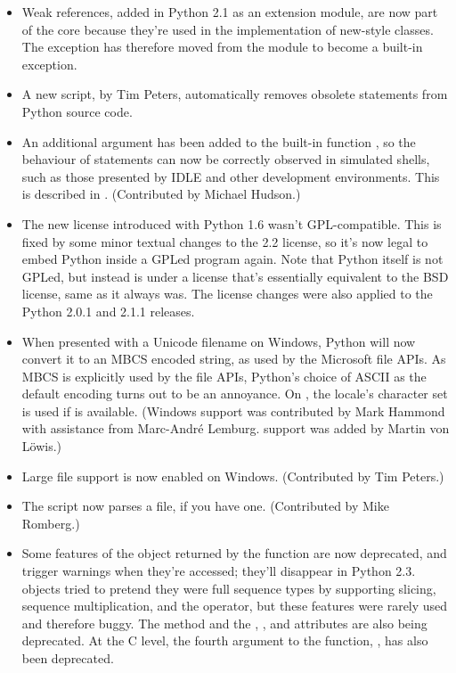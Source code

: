 \documentclass{howto}
\begin{document}
\begin{itemize}
  \item Weak references, added in Python 2.1 as an extension module,
  are now part of the core because they're used in the implementation
  of new-style classes.  The  exception has
  therefore moved from the  module to become a
  built-in exception.

  \item A new script,  by Tim
  Peters, automatically removes obsolete  statements
  from Python source code.

  \item An additional  argument has been added to the
  built-in function , so the behaviour of
   statements can now be correctly observed in
  simulated shells, such as those presented by IDLE and other
  development environments.  This is described in .
  (Contributed by Michael Hudson.)

  \item The new license introduced with Python 1.6 wasn't
  GPL-compatible.  This is fixed by some minor textual changes to the
  2.2 license, so it's now legal to embed Python inside a GPLed
  program again.  Note that Python itself is not GPLed, but instead is
  under a license that's essentially equivalent to the BSD license,
  same as it always was.  The license changes were also applied to the
  Python 2.0.1 and 2.1.1 releases.

  \item When presented with a Unicode filename on Windows, Python will
  now convert it to an MBCS encoded string, as used by the Microsoft
  file APIs.  As MBCS is explicitly used by the file APIs, Python's
  choice of ASCII as the default encoding turns out to be an
  annoyance.  On \UNIX, the locale's character set is used if
   is available.  (Windows
  support was contributed by Mark Hammond with assistance from
  Marc-Andr\'e Lemburg. \UNIX{} support was added by Martin von L\"owis.)

  \item Large file support is now enabled on Windows.  (Contributed by
  Tim Peters.)

  \item The  script
  now parses a  file, if you have one.
  (Contributed by Mike Romberg.) 

  \item Some features of the object returned by the
   function are now deprecated, and trigger
  warnings when they're accessed; they'll disappear in Python 2.3.
   objects tried to pretend they were full sequence
  types by supporting slicing, sequence multiplication, and the
   operator, but these features were rarely used and
  therefore buggy.  The  method and the
  , , and  attributes are also
  being deprecated.  At the C level, the fourth argument to the
   function, , has also been
  deprecated.


\end{itemize}
\end{document}
